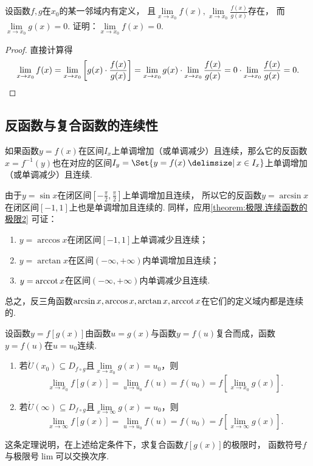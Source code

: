 \begin{example}
设函数\(f,g\)在\(x_0\)的某一邻域内有定义，
且\(\lim\limits_{x\to x_0}f(x),
\lim\limits_{x\to x_0}\frac{f(x)}{g(x)}\)存在，
而\(\lim\limits_{x\to x_0}g(x)=0\).
证明：\(\lim\limits_{x\to x_0}f(x)=0\).
\begin{proof}
直接计算得\[
	\lim\limits_{x\to x_0}f(x)
	= \lim\limits_{x\to x_0}\left[
		g(x) \cdot \frac{f(x)}{g(x)}
	\right]
	= \lim\limits_{x\to x_0}g(x) \cdot \lim\limits_{x\to x_0}\frac{f(x)}{g(x)}
	= 0 \cdot \lim\limits_{x\to x_0}\frac{f(x)}{g(x)} = 0.
	\qedhere
\]
\end{proof}
\end{example}

\subsection{反函数与复合函数的连续性}
\begin{theorem}\label{theorem:极限.连续函数的极限2}
如果函数\(y = f(x)\)在区间\(I_x\)上单调增加（或单调减少）且连续，那么它的反函数\(x = f^{-1}(y)\)也在对应的区间\(I_y = \Set{ y = f(x) \given x \in I_x }\)上单调增加（或单调减少）且连续.
\end{theorem}

\begin{example}
由于\(y=\sin x\)在闭区间\(\left[-\frac{\pi}{2},\frac{\pi}{2}\right]\)上单调增加且连续，
所以它的反函数\(y=\arcsin x\)在闭区间\([-1,1]\)上也是单调增加且连续的.
同样，应用\cref{theorem:极限.连续函数的极限2} 可证：
\begin{enumerate}
	\item \(y=\arccos x\)在闭区间\([-1,1]\)上单调减少且连续；
	\item \(y=\arctan x\)在区间\((-\infty,+\infty)\)内单调增加且连续；
	\item \(y=\arccot x\)在区间\((-\infty,+\infty)\)内单调减少且连续.
\end{enumerate}
总之，反三角函数\(\arcsin x,\arccos x,\arctan x,\arccot x\)在它们的定义域内都是连续的.
\end{example}

\begin{theorem}\label{theorem:极限.连续函数的极限3}
\def\D{D_{f \circ g}}
设函数\(y = f[g(x)]\)由函数\(u = g(x)\)与函数\(y = f(u)\)复合而成，函数\(y = f(u)\)在\(u = u_0\)连续.
\begin{enumerate}
\item 若\(\mathring{U}(x_0) \subseteq \D\)且\(\lim\limits_{x \to x_0}g(x) = u_0\)，则\[
\lim\limits_{x \to x_0}f[g(x)]
= \lim\limits_{u \to u_0}f(u) = f(u_0)
= f\left[ \lim\limits_{x \to x_0} g(x) \right].
\]

\item 若\(\mathring{U}(\infty) \subseteq \D\)且\(\lim\limits_{x\to\infty}g(x) = u_0\)，则\[
\lim\limits_{x \to \infty}f[g(x)]
= \lim\limits_{u \to u_0}f(u) = f(u_0)
= f\left[ \lim\limits_{x \to \infty} g(x) \right].
\]
\end{enumerate}
\end{theorem}
这条定理说明，在上述给定条件下，求复合函数\(f[g(x)]\)的极限时，
函数符号\(f\)与极限号\(\lim\)可以交换次序.

